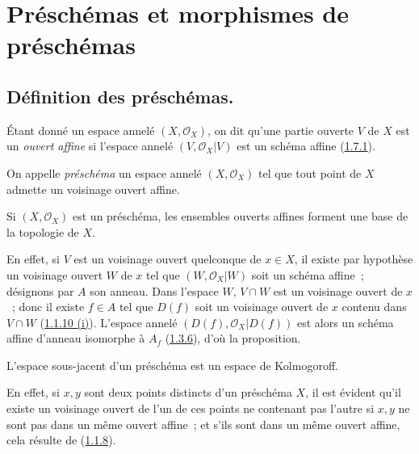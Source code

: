 \section{Préschémas et morphismes de préschémas}
\label{section:I.2-fr}

\subsection{Définition des préschémas.}
\label{subsection:I.2.1-fr}

\begin{env}[2.1.1]
\label{I.2.1.1-fr}
Étant donné un espace annelé $(X,\mathscr{O}_X)$, on dit qu'une partie ouverte
$V$ de $X$ est un \emph{ouvert affine} si l'espace annelé
$(V,\mathscr{O}_X|V)$ est un schéma affine
(\hyperref[I.1.7.1-fr]{1.7.1}).
\end{env}

\begin{definition}[2.1.2]
\label{I.2.1.2-fr}
On appelle \emph{préschéma} un espace annelé $(X,\mathscr{O}_X)$ tel que tout
point de $X$ admette un voisinage ouvert affine.
\end{definition}


\begin{proposition}[2.1.3]
\label{I.2.1.3-fr}
Si $(X,\mathscr{O}_X)$ est un préschéma, les ensembles ouverts affines forment
une base de la topologie de $X$.
\end{proposition}

En effet, si $V$ est un voisinage ouvert quelconque de $x\in X$, il existe par
hypothèse un voisinage ouvert $W$ de $x$ tel que
$(W,\mathscr{O}_X|W)$ soit un schéma affine~; désignons par $A$ son anneau.
Dans l'espace $W$, $V\cap W$ est un voisinage ouvert de $x$~; donc il existe
$f\in A$ tel que $D(f)$ soit un voisinage ouvert de $x$ contenu dans
$V\cap W$ (\hyperref[I.1.1.10-fr]{1.1.10 (i)}). L'espace annelé
$(D(f),\mathscr{O}_X|D(f))$ est alors un schéma affine d'anneau isomorphe à
$A_f$ (\hyperref[I.1.3.6-fr]{1.3.6}), d'où la proposition.

\begin{proposition}[2.1.4]
\label{I.2.1.4-fr}
L'espace sous-jacent d'un préschéma est un espace de Kolmogoroff.
\end{proposition}

En effet, si $x,y$ sont deux points distincts d'un préschéma $X$, il est
évident qu'il existe un voisinage ouvert de l'un de ces points ne contenant
pas l'autre si $x,y$ ne sont pas dans un même ouvert affine~; et s'ils sont
dans un même ouvert affine, cela résulte de
(\hyperref[I.1.1.8-fr]{1.1.8}).

